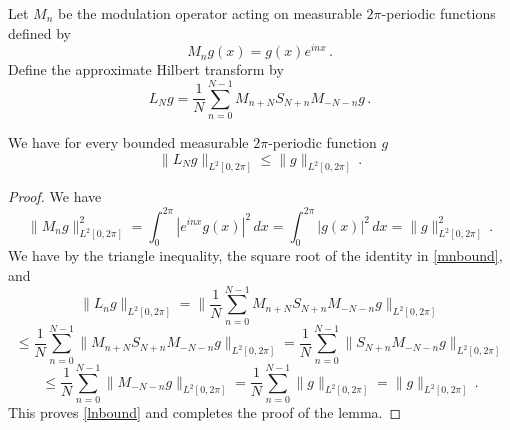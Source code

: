 Let $M_n$ be the modulation operator
acting on measurable $2\pi$-periodic functions
defined by
\begin{equation}
    M_ng(x)=g(x) e^{inx}\, .
\end{equation}
Define the approximate Hilbert transform by
\begin{equation}
    L_N g=\frac 1N\sum_{n=0}^{N-1}
       M_{n+N} S_{N+n}M_{-N-n}g\, .
\end{equation}


\begin{lemma}
\label{modulated-averaged-projection}
\leanok
{}
We have for every bounded measurable $2\pi$-periodic function $g$
\begin{equation}\label{lnbound}
    \|L_Ng\|_{L^2[0, 2\pi]}\le \|g\|_{L^2[0, 2\pi]}\,.
\end{equation}
\end{lemma}
\begin{proof}
    \leanok
    We have
    \begin{equation}\label{mnbound}
        \|M_ng\|_{L^2[0, 2\pi]}^2=\int_{0}^{2\pi} |e^{inx}g(x)|^2\, dx
        =\int_{0}^{2\pi} |g(x)|^2\, dx=\|g\|_{L^2[0, 2\pi]}^2\, .
    \end{equation}
     We have by the triangle inequality, the square root of the identity in \eqref{mnbound}, and 
    \begin{equation*}
        \|L_ng\|_{L^2[0, 2\pi]}=\|\frac 1N\sum_{n=0}^{N-1}
       M_{n+N} S_{N+n}M_{-N-n}g\|_{L^2[0, 2\pi]}
    \end{equation*}
    \begin{equation*}
        \le \frac 1N\sum_{n=0}^{N-1} \|
       M_{n+N} S_{N+n}M_{-N-n}g\|_{L^2[0, 2\pi]}
         = \frac 1N\sum_{n=0}^{N-1} \|
    S_{N+n}M_{-N-n}g\|_{L^2[0, 2\pi]}
    \end{equation*}
     \begin{equation}
     \le \frac 1N\sum_{n=0}^{N-1} \|
 M_{-N-n}g\|_{L^2[0, 2\pi]} = \frac 1N\sum_{n=0}^{N-1} \|
g\|_{L^2[0, 2\pi]} =\|g\|_{L^2[0, 2\pi]}\, .
    \end{equation}
This proves \eqref{lnbound} and completes the proof of the lemma.
\end{proof}


